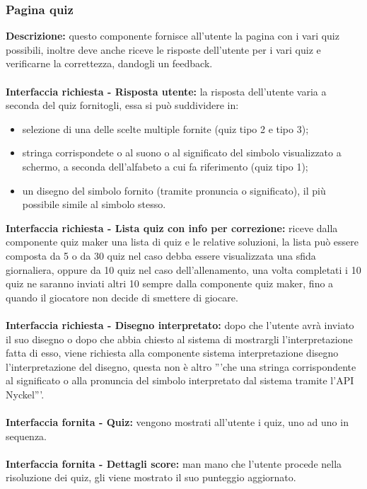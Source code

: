 \subsubsection{Pagina quiz}
\textbf{Descrizione: }questo componente fornisce all'utente la pagina con i vari quiz possibili, inoltre deve anche riceve le risposte dell'utente per i vari quiz e verificarne la correttezza, dandogli un feedback.\\
\\
\textbf{Interfaccia richiesta - Risposta utente: }la risposta dell'utente varia a seconda del quiz fornitogli, essa si può suddividere in:
\begin{itemize}
    \item selezione di una delle scelte multiple fornite (quiz tipo 2 e tipo 3);
    \item stringa corrispondete o al suono o al significato del simbolo visualizzato a schermo, a seconda dell'alfabeto a cui fa riferimento (quiz tipo 1);
    \item un disegno del simbolo fornito (tramite pronuncia o significato), il più possibile simile al simbolo stesso.
\end{itemize}
\noindent
\textbf{Interfaccia richiesta - Lista quiz con info per correzione: }riceve dalla componente quiz maker una lista di quiz e le relative soluzioni, la lista può essere composta da 5 o da 30 quiz nel caso debba essere visualizzata una sfida giornaliera, oppure da 10 quiz nel caso dell'allenamento, una volta completati i 10 quiz ne saranno inviati altri 10 sempre dalla componente quiz maker, fino a quando il giocatore non decide di smettere di giocare.\\
\\
\textbf{Interfaccia richiesta - Disegno interpretato: }dopo che l'utente avrà inviato il suo disegno o dopo che abbia chiesto al sistema di mostrargli l'interpretazione fatta di esso, viene richiesta alla componente sistema interpretazione disegno l'interpretazione del disegno, questa non è altro '''che una stringa corrispondente al significato o alla pronuncia del simbolo interpretato dal sistema tramite l'API Nyckel'''.\\
\\
\textbf{Interfaccia fornita - Quiz: }vengono mostrati all'utente i quiz, uno ad uno in sequenza.\\
\\
\textbf{Interfaccia fornita - Dettagli score: }man mano che l'utente procede nella risoluzione dei quiz, gli viene mostrato il suo punteggio aggiornato.\\
